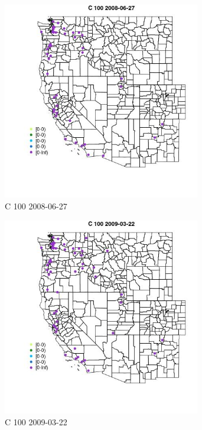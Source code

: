 \begin{figure} 
\centering  
\includegraphics[width=0.77\textwidth]{Code_Outputs/Report_ML_input_PM25_Step4_part_e_de_duplicated_aves_MapObsC_1002008-06-27.jpg} 
\caption{\label{fig:Report_ML_input_PM25_Step4_part_e_de_duplicated_avesMapObsC_1002008-06-27}C 100 2008-06-27} 
\end{figure} 
 

\begin{figure} 
\centering  
\includegraphics[width=0.77\textwidth]{Code_Outputs/Report_ML_input_PM25_Step4_part_e_de_duplicated_aves_MapObsC_1002009-03-22.jpg} 
\caption{\label{fig:Report_ML_input_PM25_Step4_part_e_de_duplicated_avesMapObsC_1002009-03-22}C 100 2009-03-22} 
\end{figure} 
 

